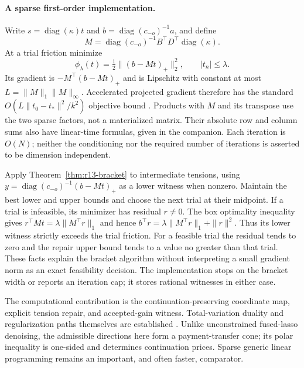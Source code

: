 \paragraph{A sparse first-order implementation.}
Write $s=\operatorname{diag}(\kappa)t$ and $b=\operatorname{diag}(c_{-o})^{-1}a$, and define
\[M=\operatorname{diag}(c_{-o})^{-1}B^\top D^\top\operatorname{diag}(\kappa).\]
At a trial friction minimize
\begin{equation}\label{eq:r13-feasibility}
 \phi_\lambda(t)=\tfrac12\|(b-Mt)_+\|_2^2,\qquad |t_n|\leq\lambda.
\end{equation}
Its gradient is $-M^\top(b-Mt)_+$ and is Lipschitz with constant at most $L=\|M\|_1\|M\|_\infty$. Accelerated projected gradient therefore has the standard $O(L\|t_0-t_*\|^2/k^2)$ objective bound \citep{BeckTeboulle2009}. Products with $M$ and its transpose use the two sparse factors, not a materialized matrix. Their absolute row and column sums also have linear-time formulas, given in the companion. Each iteration is $O(N)$; neither the conditioning nor the required number of iterations is asserted to be dimension independent.

Apply Theorem~\ref{thm:r13-bracket} to intermediate tensions, using
$y=\operatorname{diag}(c_{-o})^{-1}(b-Mt)_+$ as a lower witness when nonzero. Maintain the best lower and upper bounds and choose the next trial at their midpoint. If a trial is infeasible, its minimizer has residual $r\ne0$. The box optimality inequality gives
$r^\top Mt=\lambda\|M^\top r\|_1$ and hence
$b^\top r=\lambda\|M^\top r\|_1+\|r\|^2$.
Thus its lower witness strictly exceeds the trial friction. For a feasible trial the residual tends to zero and the repair upper bound tends to a value no greater than that trial. These facts explain the bracket algorithm without interpreting a small gradient norm as an exact feasibility decision. The implementation stops on the bracket width or reports an iteration cap; it stores rational witnesses in either case.

The computational contribution is the continuation-preserving coordinate map, explicit tension repair, and accepted-gain witness. Total-variation duality and regularization paths themselves are established \citep{TibshiraniTaylor2011,ArnoldTibshirani2016}. Unlike unconstrained fused-lasso denoising, the admissible directions here form a payment-transfer cone; its polar inequality is one-sided and determines continuation prices. Sparse generic linear programming remains an important, and often faster, comparator.
